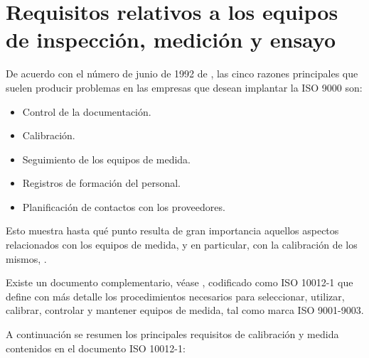 
\section
	[Requisitos para los equipos de medida]
	{Requisitos relativos a los equipos de inspección, medición y ensayo}

De acuerdo con el número de junio de 1992 de , las cinco razones principales que suelen producir problemas en las empresas que desean implantar la ISO 9000 son:

\begin{itemize}

	\item
	Control de la documentación.
	\item 
	Calibración.
	\item
	Seguimiento de los equipos de medida.
	\item
	Registros de formación del personal.
	\item
	Planificación de contactos con los proveedores.

\end{itemize}

Esto muestra hasta qué punto resulta de gran importancia aquellos aspectos relacionados con los equipos de medida, y en particular, con la calibración de los mismos, \parencite{griful1998control}.

Existe un documento complementario, véase \parencite{UNE-EN-30012-1}, codificado como ISO 10012-1 que define con más detalle los procedimientos necesarios para seleccionar, utilizar, calibrar, controlar y mantener equipos de medida, tal como marca ISO 9001-9003.

A continuación se resumen los principales requisitos de calibración y medida contenidos en el documento ISO 10012-1:

